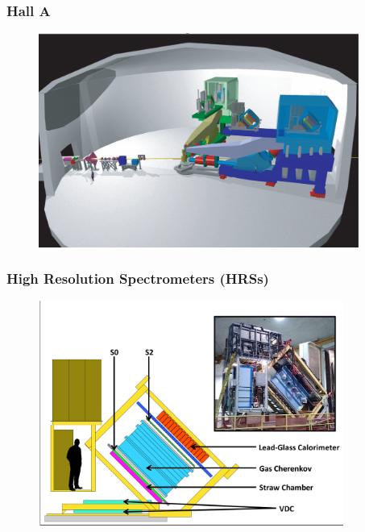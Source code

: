 \documentclass[12pt]{beamer}
\begin{document}
\begin{frame}
\frametitle{Hall A}
\begin{figure}
	\includegraphics[width=10.5cm]{../images/halla.pdf}
\end{figure}
\end{frame}

\begin{frame}
\frametitle{High Resolution Spectrometers (HRSs)}
	\begin{figure}
		\includegraphics[width=10cm]{../images/HRS_cartoon}
	\end{figure}
\end{frame}





\end{document}
